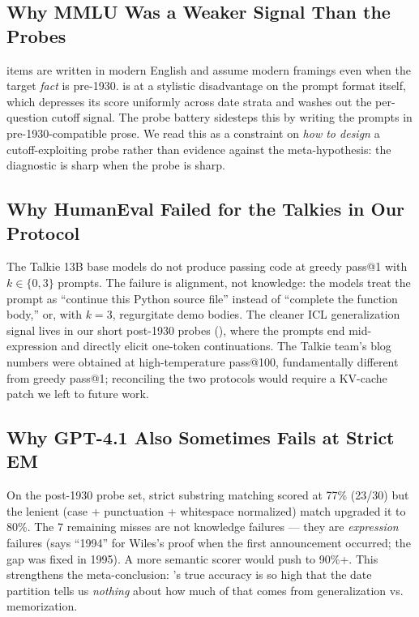 \subsection{Why MMLU Was a Weaker Signal Than the Probes}

\mmlu items are written in modern English and assume modern framings even when the target \emph{fact} is pre-1930. \talkienineteen is at a stylistic disadvantage on the prompt format itself, which depresses its score uniformly across date strata and washes out the per-question cutoff signal. The probe battery sidesteps this by writing the prompts in pre-1930-compatible prose. We read this as a constraint on \emph{how to design} a cutoff-exploiting probe rather than evidence against the meta-hypothesis: the diagnostic is sharp when the probe is sharp.

\subsection{Why HumanEval Failed for the Talkies in Our Protocol}

The Talkie 13B base models do not produce passing \humaneval code at greedy pass@1 with $k \in \{0, 3\}$ prompts. The failure is alignment, not knowledge: the models treat the \humaneval prompt as ``continue this Python source file'' instead of ``complete the function body,'' or, with $k=3$, regurgitate demo bodies. The cleaner ICL generalization signal lives in our short post-1930 probes (), where the prompts end mid-expression and directly elicit one-token continuations. The Talkie team's blog \humaneval numbers were obtained at high-temperature pass@100, fundamentally different from greedy pass@1; reconciling the two protocols would require a KV-cache patch we left to future work.

\subsection{Why GPT-4.1 Also Sometimes Fails at Strict EM}

On the post-1930 probe set, strict substring matching scored \gptfour at 77\% (23/30) but the lenient (case + punctuation + whitespace normalized) match upgraded it to 80\%. The 7 remaining misses are not knowledge failures --- they are \emph{expression} failures (\eg \gptfour says ``1994'' for Wiles's proof when the first announcement occurred; the gap was fixed in 1995). A more semantic scorer would push \gptfour to 90\%+. This strengthens the meta-conclusion: \gptfour's true accuracy is so high that the date partition tells us \emph{nothing} about how much of that comes from generalization vs. memorization.

